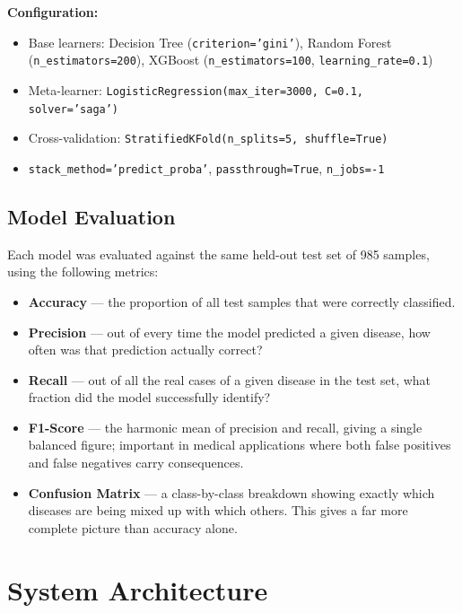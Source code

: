 \documentclass[12pt,a4paper]{article}
\begin{document}
\textbf{Configuration:}
\begin{itemize}
    \item Base learners: Decision Tree (\texttt{criterion='gini'}), Random Forest (\texttt{n\_estimators=200}), XGBoost (\texttt{n\_estimators=100}, \texttt{learning\_rate=0.1})
    \item Meta-learner: \texttt{LogisticRegression(max\_iter=3000, C=0.1, solver='saga')}
    \item Cross-validation: \texttt{StratifiedKFold(n\_splits=5, shuffle=True)}
    \item \texttt{stack\_method='predict\_proba'}, \texttt{passthrough=True}, \texttt{n\_jobs=-1}
\end{itemize}

\subsection{Model Evaluation}

Each model was evaluated against the same held-out test set of 985 samples, using the following metrics:
\begin{itemize}
    \item \textbf{Accuracy} --- the proportion of all test samples that were correctly classified.
    \item \textbf{Precision} --- out of every time the model predicted a given disease, how often was that prediction actually correct?
    \item \textbf{Recall} --- out of all the real cases of a given disease in the test set, what fraction did the model successfully identify?
    \item \textbf{F1-Score} --- the harmonic mean of precision and recall, giving a single balanced figure; important in medical applications where both false positives and false negatives carry consequences.
    \item \textbf{Confusion Matrix} --- a class-by-class breakdown showing exactly which diseases are being mixed up with which others. This gives a far more complete picture than accuracy alone.
\end{itemize}

\newpage
\section{System Architecture}
\end{document}
